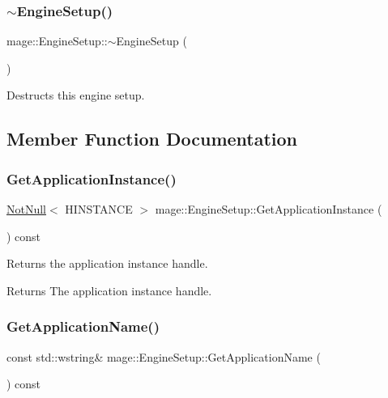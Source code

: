 \subsubsection{\texorpdfstring{$\sim$\+Engine\+Setup()}{~EngineSetup()}}
{\footnotesize\ttfamily mage\+::\+Engine\+Setup\+::$\sim$\+Engine\+Setup (\begin{DoxyParamCaption}{ }\end{DoxyParamCaption})\hspace{0.3cm}{\ttfamily [default]}}

Destructs this engine setup. 

\subsection{Member Function Documentation}
\mbox{\label{classmage_1_1_engine_setup_a278a3df908b5b369a597812de4010532}} 
\subsubsection{\texorpdfstring{Get\+Application\+Instance()}{GetApplicationInstance()}}
{\footnotesize\ttfamily \mbox{\hyperlink{namespacemage_a8769f9d670d6b585ea306cb1062af94b}{Not\+Null}}$<$ H\+I\+N\+S\+T\+A\+N\+CE $>$ mage\+::\+Engine\+Setup\+::\+Get\+Application\+Instance (\begin{DoxyParamCaption}{ }\end{DoxyParamCaption}) const\hspace{0.3cm}{\ttfamily [noexcept]}}

Returns the application instance handle.

\begin{DoxyReturn}{Returns}
The application instance handle. 
\end{DoxyReturn}
\mbox{\label{classmage_1_1_engine_setup_a924fbb8eb1a131d62b8f92bdab4286ae}} 
\subsubsection{\texorpdfstring{Get\+Application\+Name()}{GetApplicationName()}}
{\footnotesize\ttfamily const std\+::wstring\& mage\+::\+Engine\+Setup\+::\+Get\+Application\+Name (\begin{DoxyParamCaption}{ }\end{DoxyParamCaption}) const\hspace{0.3cm}{\ttfamily [noexcept]}}

